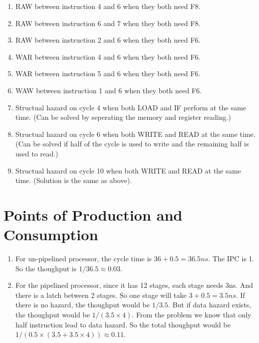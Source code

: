\documentclass{article}
\begin{document}
\begin{enumerate}
\begin{enumerate}
	    \item RAW between instruction 4 and 6 when they both need F8.
	    \item RAW between instruction 6 and 7 when they both need F8.
	    \item RAW between instruction 2 and 6 when they both need F6.
	    \item WAR between instruction 4 and 6 when they both need F6.
	    \item WAR between instruction 5 and 6 when they both need F6.
	    \item WAW between instruction 1 and 6 when they both need F6.
	    \item Structual hazard on cycle 4 when both LOAD and IF perform at the same time. (Can be solved by seperating the memory and register reading.)
	    \item Structual hazard on cycle 6 when both WRITE and READ at the same time. (Can be solved if half of the cycle is used to write and the remaining half is used to read.)
	    \item Structual hazard on cycle 10 when both WRITE and READ at the same time. (Solution is the same as above).
    \end{enumerate}
    \end{enumerate}

    \section{Points of Production and Consumption}
    \begin{enumerate}
    \item For un-pipelined processor, the cycle time is $36 + 0.5 = 36.5ns$. The IPC is 1. So the thoughput is $1 / 36.5 \approx 0.03$.
    \item For the pipelined processor, since it has 12 stages, each stage needs 3ns. And there is a latch between 2 stages. So one stage will take $3 + 0.5 = 3.5ns$.
    If there is no hazard, the thoughput would be $1 / 3.5$. But if data hazard exists, the thoughput would be $1 / (3.5 \times 4)$. From the problem we know that only half instruction lead to data hazard. So the total thoughput would be $1 / (0.5 \times (3.5 + 3.5 \times 4)) \approx 0.11$.
    \end{enumerate}
\end{document}
